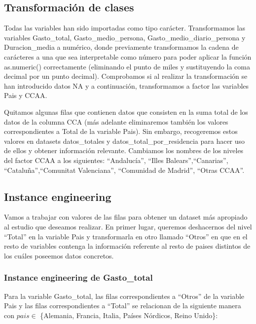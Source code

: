 \documentclass[data,article,submit,moreauthors,pdftex]{Definitions/mdpi}
\begin{document}
\subsection{Transformación de clases}\label{transformaciuxf3n-de-clases}

Todas las variables han sido importadas como tipo carácter.
Transformamos las variables Gasto\_total, Gasto\_medio\_persona,
Gasto\_medio\_diario\_persona y Duracion\_media a numérico, donde
previamente transformamos la cadena de carácteres a una que sea
interpretable como número para poder aplicar la función as.numeric()
correctamente (eliminando el punto de miles y sustituyendo la coma
decimal por un punto decimal). Comprobamos si al realizar la
transformación se han introducido datos NA y a continuación,
transformamos a factor las variables Pais y CCAA.

Quitamos algunas filas que contienen datos que consisten en la suma
total de los datos de la columna CCA (más adelante eliminaremos también
los valores correspondientes a Total de la variable Pais). Sin embargo,
recogeremos estos valores en datasets datos\_totales y
datos\_total\_por\_residencia para hacer uso de ellos y obtener
información relevante. Cambiamos los nombres de los niveles del factor
CCAA a los siguientes: ``Andalucía'', ``Illes Balears'',``Canarias'',
``Cataluña'',``Comunitat Valenciana'', ``Comunidad de Madrid'', ``Otras
CCAA''.

\subsection{Instance engineering}\label{instance-engineering}

Vamos a trabajar con valores de las filas para obtener un dataset más
apropiado al estudio que deseamos realizar. En primer lugar, queremos
deshacernos del nivel ``Total'' en la variable Pais y transformarla en
otro llamado ``Otros'' en que en el resto de variables contenga la
información referente al resto de paises distintos de los cuáles
poseemos datos concretos.

\subsubsection{Instance engineering de
Gasto\_total}\label{instance-engineering-de-gasto_total}

Para la variable Gasto\_total, las filas correspondientes a ``Otros'' de
la variable Pais y las filas correspondientes a ``Total'' se relacionan
de la siguiente manera con \(pais\in\) \{Alemania, Francia, Italia,
Países Nórdicos, Reino Unido\}:
\end{document}

